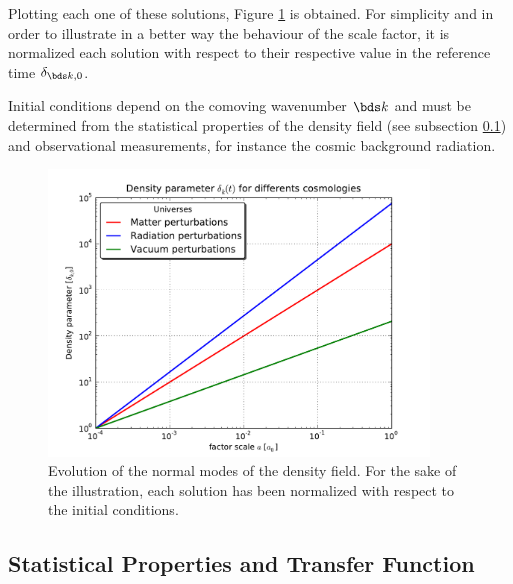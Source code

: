 Plotting each one of these solutions, Figure \ref{fig:DeltaEvolution} is 
obtained. For simplicity and in order to illustrate in a better way the 
behaviour of the scale factor, it is normalized each solution with respect
to their respective value in the reference time $\delta_{\bds k, 0}$.


Initial conditions depend on the comoving wavenumber $\bds k$ and must be
determined from the statistical properties of the density field (see 
subsection \ref{subsec:StatisticalProperties}) and observational 
measurements, for instance the cosmic background radiation.



\begin{figure}[htbp]
	\centering
	\includegraphics[width=0.9\textwidth]
	{./figures/2_theoretical_framework/Perturbations_Evolution.pdf}

	\caption{\small{Evolution of the normal modes of the density field.
	For the sake of the illustration, each solution has been normalized
	with respect to the initial conditions.}}
	
	\label{fig:DeltaEvolution}
\end{figure}



	\subsection{Statistical Properties and Transfer Function}
	\label{subsec:StatisticalProperties}


